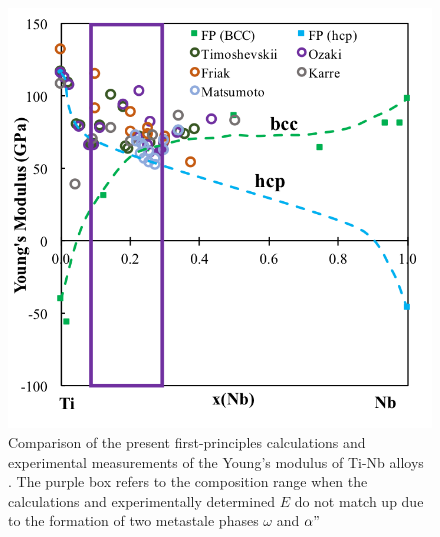 \newpage
\begin{figure}[H]
	\centering
	\includegraphics{Chapter-1/Figures/TiNbElastic.png}
	\caption{Comparison of the present first-principles calculations and experimental measurements of the Young's modulus of Ti-Nb alloys \cite{Timoshevskii2011,Ozaki2004,Friak2012,Karre2015,Matsumoto2006}. The purple box refers to the composition range when the calculations and experimentally determined $E$ do not match up due to the formation of two metastale phases $\omega$ and $\alpha"$}
	\label{Ch1-figure:tinbelasitc}
\end{figure}
